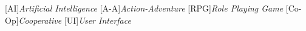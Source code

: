 [AI]{\emph{Artificial Intelligence}}
[A-A]{\emph{Action-Adventure}}
[RPG]{\emph{Role Playing Game}}
[Co-Op]{\emph{Cooperative}}
[UI]{\emph{User Interface}}

